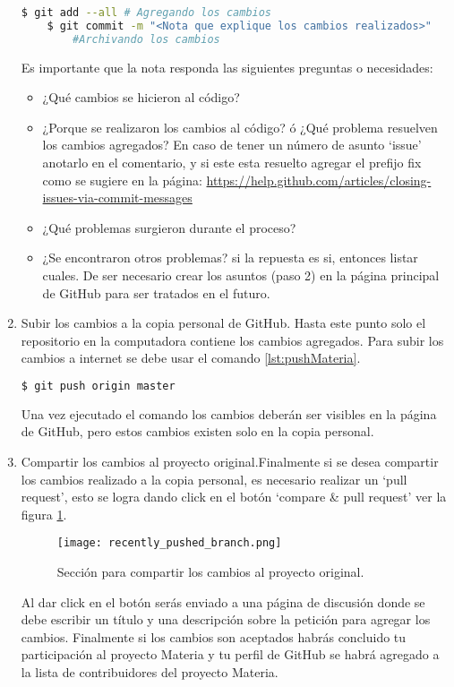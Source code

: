 \begin{enumerate}
\begin{lstlisting}[caption={Agregar los cambios al repositorio local.},label={lst:addCommit},language=bash]
	$ git add --all # Agregando los cambios 
	$ git commit -m "<Nota que explique los cambios realizados>" 
		#Archivando los cambios
\end{lstlisting}
		
		Es importante que la nota responda las siguientes preguntas o necesidades:
			\begin{itemize}\itemsep0ex
	 			\item ¿Qué cambios se hicieron al código?
	 			\item ¿Porque se realizaron los cambios al código? ó ¿Qué problema resuelven los cambios agregados? En caso de tener un número de asunto `issue' anotarlo en el comentario, y si este esta resuelto agregar el prefijo fix como se sugiere en la página: \url{https://help.github.com/articles/closing-issues-via-commit-messages}
	 			\item ¿Qué problemas surgieron durante el proceso?
	 			\item ¿Se encontraron otros problemas? si la repuesta es si, entonces listar cuales. De ser necesario crear los asuntos (paso 2) en la página principal de GitHub para ser tratados en el futuro.
		 	\end{itemize}

	 	\item Subir los cambios a la copia personal de GitHub. Hasta este punto solo el repositorio en la computadora contiene los cambios agregados. Para subir los cambios a internet se debe usar el comando \ref{lst:pushMateria}.

	 	\begin{lstlisting}[caption={Comando para agregar los cambios a la copia personal de GitHub},label={lst:pushMateria},language=bash]
	 		$ git push origin master 
	 	\end{lstlisting}

	 	Una vez ejecutado el comando los cambios deberán ser visibles en la página de GitHub, pero estos cambios existen solo en la copia personal.

	 	\item Compartir los cambios al proyecto original.Finalmente si se desea compartir los cambios realizado a la copia personal, es necesario realizar un `pull request', esto se logra dando click en el botón `compare \& pull request' ver la figura \ref{fig:pullRequestMateria}.

	 	\begin{figure}[!h]
	 		\texttt{[image: recently\_pushed\_branch.png]}
	 		 \caption{Sección para compartir los cambios al proyecto original.}
	 		 \label{fig:pullRequestMateria}
	 	\end{figure}

	 	Al dar click en el botón serás enviado a una página de discusión donde se debe escribir un título y una descripción sobre la petición para agregar los cambios. Finalmente si los cambios son aceptados habrás concluido tu participación al proyecto Materia y tu perfil de GitHub se habrá agregado a la lista de contribuidores del proyecto Materia.

	\end{enumerate}



